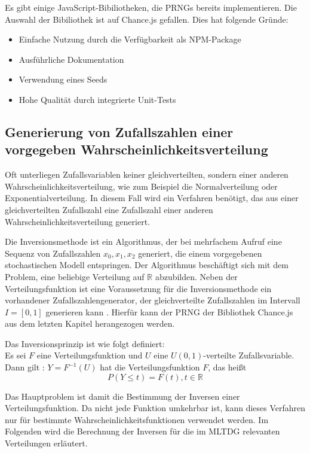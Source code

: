 Es gibt einige JavaScript-Bibiliotheken, die \ac{PRNG}s bereits implementieren. Die Auswahl der Bibiliothek ist auf Chance.js gefallen. Dies hat folgende Gründe:
\begin{itemize}
    \item Einfache Nutzung durch die Verfügbarkeit als NPM-Package
    \item Ausführliche Dokumentation
    \item Verwendung eines Seeds
    \item Hohe Qualität durch integrierte Unit-Tests
\end{itemize}

\subsection{Generierung von Zufallszahlen einer vorgegeben Wahrscheinlichkeitsverteilung}

Oft unterliegen Zufallsvariablen keiner gleichverteilten, sondern einer anderen Wahrscheinlichkeitsverteilung, wie zum Beispiel die Normalverteilung oder Exponentialverteilung. In diesem Fall wird ein Verfahren benötigt, das aus einer gleichverteilten Zufallszahl eine Zufallszahl einer anderen Wahrscheinlichkeitsverteilung generiert.

Die Inversionsmethode ist ein Algorithmus, der bei mehrfachem Aufruf eine Sequenz von Zufallszahlen $x_0, x_1, x_2$ generiert, die einem vorgegebenen stochastischen Modell entspringen. Der Algorithmus beschäftigt sich mit dem Problem, eine beliebige Verteilung auf $\mathbb{R}$ abzubilden. Neben der Verteilungsfunktion ist eine Voraussetzung für die Inversionsmethode ein vorhandener Zufallszahlengenerator, der gleichverteilte Zufallszahlen im Intervall $I=[0,1]$ generieren kann \cite{Inversionsmethode}. Hierfür kann der \ac{PRNG} der Bibliothek Chance.js aus dem letzten Kapitel herangezogen werden.

Das Inversionsprinzip ist wie folgt definiert:\\
Es sei $F$ eine Verteilungsfunktion und $U$ eine $U(0,1)$-verteilte Zufallsvariable.\\
Dann gilt \cite{Inversionsmethode}: $Y = F^{-1}(U)$ hat die Verteilungsfunktion $F$, das heißt
$$P(Y \le t)=F(t),t \in \mathbb{R}$$

Das Hauptproblem ist damit die Bestimmung der Inversen einer Verteilungsfunktion. Da nicht jede Funktion umkehrbar ist, kann dieses Verfahren nur für bestimmte Wahrscheinlichkeitsfunktionen verwendet werden. Im Folgenden wird die Berechnung der Inversen für die im \ac{MLTDG} relevanten Verteilungen erläutert.

